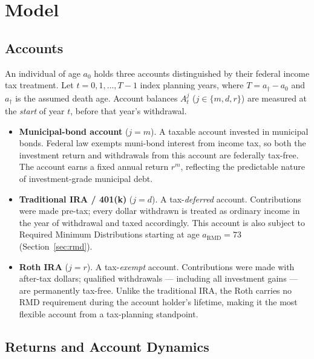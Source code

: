 \documentclass[12pt]{article}
\begin{document}
\section{Model}
\label{sec:model}

\subsection{Accounts}
\label{sec:accounts}

An individual of age $a_0$ holds three accounts distinguished by their federal
income tax treatment. Let $t = 0, 1, \ldots, T-1$ index planning years, where
$T = a_\dagger - a_0$ and $a_\dagger$ is the assumed death age. Account balances
$A^j_t$ ($j \in \{m, d, r\}$) are measured at the \emph{start} of year $t$,
before that year's withdrawal.

\begin{itemize}[leftmargin=2em]
  \item \textbf{Municipal-bond account} ($j = m$). A taxable account invested
        in municipal bonds. Federal law exempts muni-bond interest from income
        tax, so both the investment return and withdrawals from this account are
        federally tax-free. The account earns a fixed annual return $r^m$,
        reflecting the predictable nature of investment-grade municipal debt.

  \item \textbf{Traditional IRA / 401(k)} ($j = d$). A tax-\emph{deferred}
        account. Contributions were made pre-tax; every dollar withdrawn is
        treated as ordinary income in the year of withdrawal and taxed
        accordingly. This account is also subject to Required Minimum
        Distributions starting at age $a_{\mathrm{RMD}} = 73$
        (Section~\ref{sec:rmd}).

  \item \textbf{Roth IRA} ($j = r$). A tax-\emph{exempt} account.
        Contributions were made with after-tax dollars; qualified withdrawals
        --- including all investment gains --- are permanently tax-free.
        Unlike the traditional IRA, the Roth carries no RMD requirement during
        the account holder's lifetime, making it the most flexible account from
        a tax-planning standpoint.
\end{itemize}

\subsection{Returns and Account Dynamics}
\label{sec:dynamics}
\end{document}

